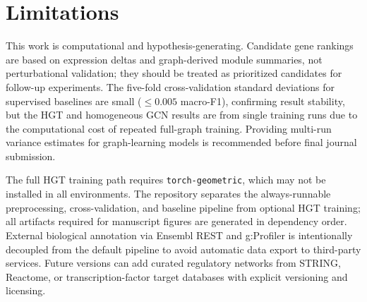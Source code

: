 \section{Limitations}

This work is computational and hypothesis-generating.
Candidate gene rankings are based on expression deltas and graph-derived module
summaries, not perturbational validation; they should be treated as prioritized
candidates for follow-up experiments.
The five-fold cross-validation standard deviations for supervised baselines are
small ($\leq 0.005$ macro-F1), confirming result stability, but the HGT and
homogeneous GCN results are from single training runs due to the computational
cost of repeated full-graph training.
Providing multi-run variance estimates for graph-learning models is recommended
before final journal submission.

The full HGT training path requires \texttt{torch-geometric}, which may not be
installed in all environments.
The repository separates the always-runnable preprocessing, cross-validation, and
baseline pipeline from optional HGT training; all artifacts required for
manuscript figures are generated in dependency order.
External biological annotation via Ensembl REST and g:Profiler is intentionally
decoupled from the default pipeline to avoid automatic data export to
third-party services.
Future versions can add curated regulatory networks from STRING, Reactome, or
transcription-factor target databases with explicit versioning and licensing.
